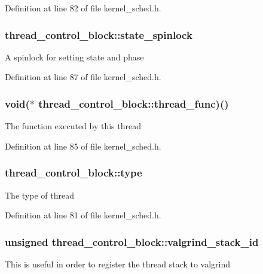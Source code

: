 Definition at line 82 of file kernel\-\_\-sched.\-h.

\hypertarget{structthread__control__block_a02ae35e9893c3b86f5e6dafe7b8c0065}{
\subsubsection[{state\-\_\-spinlock}]{ thread\-\_\-control\-\_\-block\-::state\-\_\-spinlock}}\label{structthread__control__block_a02ae35e9893c3b86f5e6dafe7b8c0065}
A spinlock for setting state and phase 

Definition at line 87 of file kernel\-\_\-sched.\-h.

\hypertarget{structthread__control__block_af78d506b8afb849bd2ea09d23b787c00}{
\subsubsection[{thread\-\_\-func}]{\setlength{\rightskip}{0pt plus 5cm}void($\ast$ thread\-\_\-control\-\_\-block\-::thread\-\_\-func)()}}\label{structthread__control__block_af78d506b8afb849bd2ea09d23b787c00}
The function executed by this thread 

Definition at line 85 of file kernel\-\_\-sched.\-h.

\hypertarget{structthread__control__block_abd0f40bdcb22c701df03f560bbc42d5c}{
\subsubsection[{type}]{ thread\-\_\-control\-\_\-block\-::type}}\label{structthread__control__block_abd0f40bdcb22c701df03f560bbc42d5c}
The type of thread 

Definition at line 81 of file kernel\-\_\-sched.\-h.

\hypertarget{structthread__control__block_ad8a2da36c0ad775c12c5f66f4fec9d41}{
\subsubsection[{valgrind\-\_\-stack\-\_\-id}]{\setlength{\rightskip}{0pt plus 5cm}unsigned thread\-\_\-control\-\_\-block\-::valgrind\-\_\-stack\-\_\-id}}\label{structthread__control__block_ad8a2da36c0ad775c12c5f66f4fec9d41}
This is useful in order to register the thread stack to valgrind 

